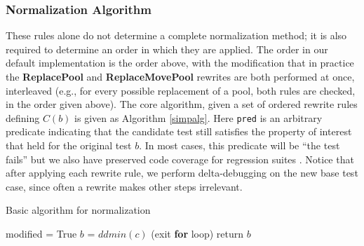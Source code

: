 \subsubsection{Normalization Algorithm}

These rules alone do not determine a complete normalization method; it is
also required to determine an order in which they are applied.  The
order in our default implementation is the order above, with the
modification that in practice the {\bf ReplacePool} and {\bf
  ReplaceMovePool} rewrites are both performed at once, interleaved
(e.g., for every possible replacement of a pool, both rules are
checked, in the order given above).  The core algorithm, given a set
of ordered rewrite rules defining $C(b)$ is given as Algorithm
\ref{simpalg}.  Here {\tt pred} is an arbitrary predicate indicating
that the candidate test still satisfies the property of interest that
held for the original test $b$.  In most cases, this predicate will be
``the test fails'' but we also have preserved
code coverage for regression suites \cite{icst2014}.  Notice that
after applying each rewrite rule, we perform delta-debugging on the
new base test case, since often a rewrite makes other steps irrelevant.

\begin{algorithm}
\caption{Basic algorithm for normalization}
\label{simpalg}
\begin{algorithmic}[1]
\State modified = True 
\State $b$ = $ddmin(c)$
 (exit {\bf for} loop) 
\EndIf 
\EndFor 
\EndWhile 
\State return $b$
\end{algorithmic}
\end{algorithm}


